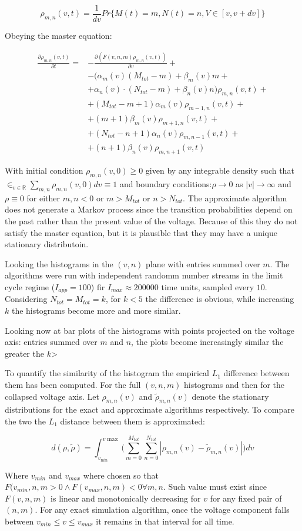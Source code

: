 $$\rho_{m,n}(v,t) = \frac{1}{dv}Pr\{M(t) = m, N(t) = n, V\in[v, v+dv]\}$$

Obeying the master equation:

\begin{align*}
	\frac{\partial\rho_{m, n}(v, t)}{\partial t} =& - \frac{\partial(F(v, n, m)\rho_{m, n}(v, t))}{\partial v} +\\
																								&-(\alpha_m(v)(M_{tot}-m)+\beta_m(v)m+\\
																								&+\alpha_n(v)\cdot(N_{tot}-m)+\beta_n(v)n)\rho_{m, n}(v, t)+\\
																								&+(M_{tot}-m+1)\alpha_m(v)\rho_{m-1, n}(v, t)+\\
																								&+(m+1)\beta_m(v)\rho_{m+1, n}(v, t)+\\
																								&+(N_{tot}-n+1)\alpha_n(v)\rho_{m, n-1}(v,t)+\\
																								&+(n+1)\beta_n(v)\rho_{m, n+1}(v, t)
\end{align*}

With initial condition $\rho_{m,n}(v,0)\ge 0$ given by any integrable density such that $\in_{v\in\mathbb{R}}\sum\limits_{m,n}\rho_{m, n}(v, 0)dv \equiv 1$ and boundary conditions:$\rho\rightarrow 0$ as $|v|\rightarrow\infty$ and $\rho\equiv 0$ for either $m, n<0$ or $m> M_{tot}$ or $n>N_{tot}$.
The approximate algorithm does not generate a Markov process since the transition probabilities depend on the past rather than the present value of the voltage.
Because of this they do not satisfy the master equation, but it is plausible that they may have a unique stationary distributoin.

Looking the histograms in the $(v, n)$ plane with entries summed over $m$.
The algorithms were run with independent randomm number streams in the limit cycle regime ($I_{app} = 100$) fir $I_{max} \approx 200000$ time units, sampled every $10$.
Considering $N_{tot} = M_{tot} = k$, for $k<5$ the difference is obvious, while increasing $k$ the histograms become more and more similar.

Looking now at bar plots of the histograms with points projected on the voltage axis: entries summed over $m$ and $n$, the plots become increasingly similar the greater the $k$>

To quantify the similarity of the histogram the empirical $L_1$ difference between them has been computed.
For the full $(v, n, m)$ histograms and then for the collapsed voltage axis.
Let $\rho_{m,n}(v)$ and $\tilde{\rho}_{m, n}(v)$ denote the stationary distributions for the exact and approximate algorithms respectively.
To compare the two the $L_1$ distance between them is approximated:

$$d(\rho,\tilde{\rho}) = \int_{v_{\min}}^{v{\max}}\biggl(\sum\limits_{m=0}^{M_{tot}}\sum\limits_{n=0}^{N_{tot}}|\rho_{m, n}(v)-\tilde{\rho}_{m,n}(v)|\biggr)dv$$

Where $v_{min}$ and $v_{max}$ where chosen so that $F(v_{min}, n, m>0\land F(v_{max}, n, m)<0\forall m,n$.
Such value must exist since $F(v,n,m)$ is linear and monotonically decreasing for $v$ for any fixed pair of $(n,m)$.
For any exact simulation algorithm, once the voltage component falls between $v_{min}\le v \le v_{max}$ it remains in that interval for all time.

